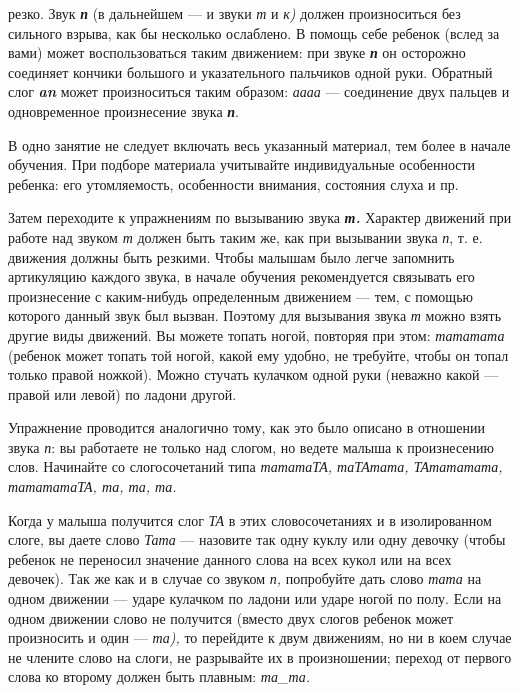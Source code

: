 \documentclass[a5paper]{book}
\renewcommand{\emph}[1]{\textit{#1}}
\begin{document}
резко. Звук \emph{\textbf{п}} (в дальнейшем --- и звуки \emph{т} и
\emph{к)} должен произноситься без сильного взрыва, как бы несколько
ослаблено. В помощь себе ребенок (вслед за вами) может воспользоваться
таким движением: при звуке \emph{\textbf{п}} он осторожно соединяет
кончики большого и указательного пальчиков одной руки. Обратный слог
\emph{\textbf{an}} может произноситься таким образом: \emph{аааа} ---
соединение двух пальцев и одновременное произнесение звука
\emph{\textbf{п}}.

В одно занятие не следует включать весь указанный материал, тем более в
начале обучения. При подборе материала учитывайте индивидуальные
особенности ребенка: его утомляемость, особенности внимания, состояния
слуха и пр.

Затем переходите к упражнениям по вызыванию звука \emph{\textbf{т.}}
Характер движений при работе над звуком \emph{т} должен быть таким же,
как при вызывании звука \emph{п}, т. е. движения должны быть резкими.
Чтобы малышам было легче запомнить артикуляцию каждого звука, в начале
обучения рекомендуется связывать его произнесение с каким-нибудь
определенным движением --- тем, с помощью которого данный звук был
вызван. Поэтому для вызывания звука \emph{т} можно взять другие виды
движений. Вы можете топать ногой, повторяя при этом: \emph{тататата}
(ребенок может топать той ногой, какой ему удобно, не требуйте, чтобы он
топал только правой ножкой). Можно стучать кулачком одной руки (неважно
какой --- правой или левой) по ладони другой.

Упражнение проводится аналогично тому, как это было описано в отношении
звука \emph{п}: вы работаете не только над слогом, но ведете малыша к
произнесению слов. Начинайте со слогосочетаний типа \emph{тататаТА,
таТАтата, ТАтататата, татататаТА, та, та, та.}

Когда у малыша получится слог \emph{ТА} в этих словосочетаниях и в
изолированном слоге, вы даете слово \emph{Тата} --- назовите так одну
куклу или одну девочку (чтобы ребенок не переносил значение данного
слова на всех кукол или на всех девочек). Так же как и в случае со
звуком \emph{п,} попробуйте дать слово \emph{тата} на одном движении ---
ударе кулачком по ладони или ударе ногой по полу. Если на одном движении
слово не получится (вместо двух слогов ребенок может произносить и один
--- \emph{та),} то перейдите к двум движениям, но ни в коем случае не
члените слово на слоги, не разрывайте их в произношении; переход от
первого слова ко второму должен быть плавным: \emph{та\_та.}
\end{document}
